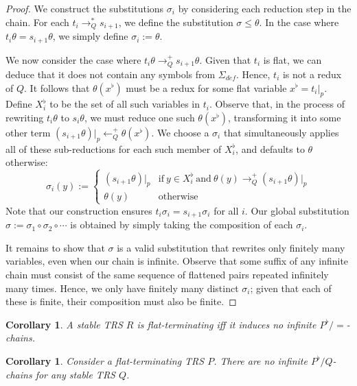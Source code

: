 \documentclass{article}
\newtheorem{corollary}[theorem]{Corollary}
\begin{document}
\begin{proof}
    We construct the substitutions $\sigma_i$ by considering each reduction step in the chain. For each $t_i \rightarrow^*_Q s_{i+1}$, we define the substitution $\sigma \leq \theta$.  In the case where $t_i\theta = s_{i+1}\theta$, we simply define $\sigma_i := \theta$. 
    
    We now consider the case where $t_i \theta \rightarrow^+_Q s_{i+1} \theta$. Given that $t_i$ is flat, we can deduce that it does not contain any symbols from $\Sigma_{def}$. Hence, $t_i$ is not a redux of $Q$. It follows that $\theta(x^\flat)$ must be a redux for some flat variable $x^\flat = t_i |_p$. Define $X_i^\flat$ to be the set of all such variables in $t_i$. Observe that, in the process of rewriting $t_i\theta$ to $s_i\theta$, we must reduce one such $\theta(x^\flat)$, transforming it into some other term $(s_{i+1} \theta)|_p \leftarrow^+_Q \theta(x^\flat)$. We choose a $\sigma_i$ that simultaneously applies all of these sub-reductions for each such member of $X_i^\flat$, and defaults to $\theta$ otherwise: 
    $$\sigma_i(y) := \begin{cases}
        (s_{i+1} \theta)|_p  &\text{if}~ y \in X_i^\flat ~\text{and}~ \theta(y) \rightarrow^+_Q (s_{i+1}\theta)|_p \\
        \theta(y) &\text{otherwise}
    \end{cases}$$
    Note that our construction ensures $t_i\sigma_i = s_{i+1}\sigma_i$ for all $i$. Our global substitution $\sigma := \sigma_1 \circ \sigma_2 \circ \cdots$ is obtained by simply taking the composition of each $\sigma_i$. 
    
    It remains to show that $\sigma$ is a valid substitution that rewrites only finitely many variables, even when our chain is infinite. Observe that some suffix of any infinite chain must consist of the same sequence of flattened pairs repeated infinitely many times. Hence, we only have finitely many distinct $\sigma_i$; given that each of these is finite, their composition must also be finite. 
\end{proof}

\begin{corollary} \label{thm:flat_chain_equality}
    A stable TRS $R$ is flat-terminating iff it induces no infinite $P^\flat/\!\!=$-chains.  
\end{corollary}

\begin{corollary}
    Consider a flat-terminating TRS $P$. There are no infinite $P^\flat/Q$-chains for any stable TRS $Q$.
\end{corollary}
\end{document}
